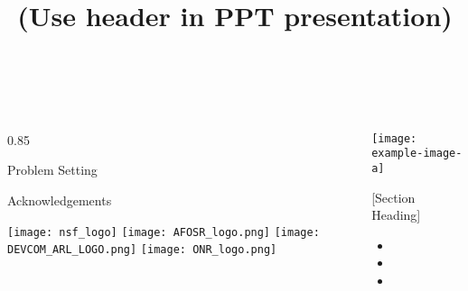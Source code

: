 \documentclass[final]{beamer}
\title{(Use header in PPT presentation)} %
\author{\ } %
\institute{\ } %
\newlength{\sepwid}
\newlength{\onecolwid}
\begin{document}

\setlength{\belowcaptionskip}{2ex} %
\setlength\belowdisplayshortskip{2ex} %

\begin{frame}[t] %

\begin{columns}[t] %

\hspace{\sepwid}
\begin{column}{0.85\onecolwid} %

\begin{block}{Problem Setting}
    \lipsum[4]
\end{block}

\begin{block}{Acknowledgements}
    \begin{center}
        \begin{minipage}{0.9\linewidth}
            \texttt{[image: nsf\_logo]}\hfill
            \texttt{[image: AFOSR\_logo.png]}\hfill
            \texttt{[image: DEVCOM\_ARL\_LOGO.png]}\hfill 
            \texttt{[image: ONR\_logo.png]} 
        \end{minipage}
    \end{center}
\end{block}

\end{column} %
\hspace{\sepwid}
\begin{column}{\onecolwid} %

    \vfill
    \begin{center}
        \texttt{[image: example-image-a]}
    \end{center}
    \vfill

    \begin{block}{[Section Heading]}
        \lipsum[2][1]
        \begin{itemize}
            \item \lipsum[2][2]
            \item \lipsum[2][3]
            \item \lipsum[2][4]
        \end{itemize}
    \end{block}


\end{column}
\end{columns}
\end{frame}
\end{document}
